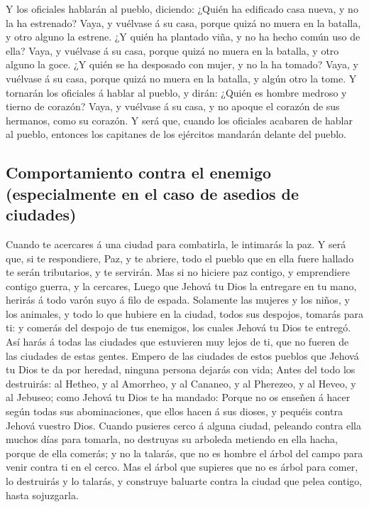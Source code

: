  Y los oficiales hablarán al pueblo, diciendo: ¿Quién ha
edificado casa nueva, y no la ha estrenado? Vaya, y vuélvase á su casa,
porque quizá no muera en la batalla, y otro alguno la estrene.
 ¿Y quién ha plantado viña, y no ha hecho común uso de ella?
Vaya, y vuélvase á su casa, porque quizá no muera en la batalla, y otro
alguno la goce.  ¿Y quién se ha desposado con mujer, y no la
ha tomado? Vaya, y vuélvase á su casa, porque quizá no muera en la
batalla, y algún otro la tome.  Y tornarán los oficiales á
hablar al pueblo, y dirán: ¿Quién es hombre medroso y tierno de corazón?
Vaya, y vuélvase á su casa, y no apoque el corazón de sus hermanos, como
su corazón.  Y será que, cuando los oficiales acabaren de
hablar al pueblo, entonces los capitanes de los ejércitos mandarán
delante del pueblo.

\hypertarget{comportamiento-contra-el-enemigo-especialmente-en-el-caso-de-asedios-de-ciudades}{%
\subsection{Comportamiento contra el enemigo (especialmente en el caso
de asedios de
ciudades)}\label{comportamiento-contra-el-enemigo-especialmente-en-el-caso-de-asedios-de-ciudades}}

 Cuando te acercares á una ciudad para combatirla, le
intimarás la paz.  Y será que, si te respondiere, Paz, y te
abriere, todo el pueblo que en ella fuere hallado te serán tributarios,
y te servirán.  Mas si no hiciere paz contigo, y
emprendiere contigo guerra, y la cercares,  Luego que
Jehová tu Dios la entregare en tu mano, herirás á todo varón suyo á filo
de espada.  Solamente las mujeres y los niños, y los
animales, y todo lo que hubiere en la ciudad, todos sus despojos,
tomarás para ti: y comerás del despojo de tus enemigos, los cuales
Jehová tu Dios te entregó.  Así harás á todas las ciudades
que estuvieren muy lejos de ti, que no fueren de las ciudades de estas
gentes.  Empero de las ciudades de estos pueblos que Jehová
tu Dios te da por heredad, ninguna persona dejarás con vida;
 Antes del todo los destruirás: al Hetheo, y al Amorrheo, y
al Cananeo, y al Pherezeo, y al Heveo, y al Jebuseo; como Jehová tu Dios
te ha mandado:  Porque no os enseñen á hacer según todas
sus abominaciones, que ellos hacen á sus dioses, y pequéis contra Jehová
vuestro Dios.  Cuando pusieres cerco á alguna ciudad,
peleando contra ella muchos días para tomarla, no destruyas su arboleda
metiendo en ella hacha, porque de ella comerás; y no la talarás, que no
es hombre el árbol del campo para venir contra ti en el cerco.
 Mas el árbol que supieres que no es árbol para comer, lo
destruirás y lo talarás, y construye baluarte contra la ciudad que pelea
contigo, hasta sojuzgarla.

